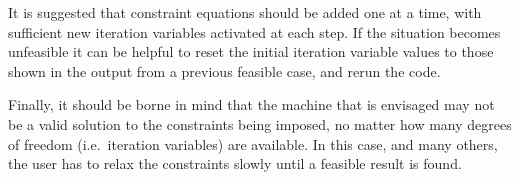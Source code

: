 It is suggested that constraint equations should be added one at a time, with
sufficient new iteration variables activated at each step.  If the situation
becomes unfeasible it can be helpful to reset the initial iteration variable
values to those shown in the output from a previous feasible case, and rerun
the code.

Finally, it should be borne in mind that the machine that is envisaged may not
be a valid solution to the constraints being imposed, no matter how many
degrees of freedom (i.e.\ iteration variables) are available. In this case,
and many others, the user has to relax the constraints slowly until a feasible
result is found.
